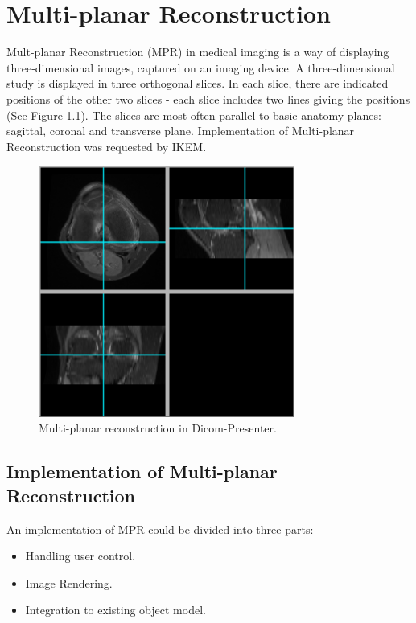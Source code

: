\chapter{Multi-planar Reconstruction}
\vspace{-10mm}
\label{multiplanar}

Mult-planar Reconstruction (MPR) in medical imaging is a way of displaying three-dimensional images, captured on an imaging device. A three-dimensional study is displayed in three orthogonal slices. In each slice, there are indicated positions of the other two slices - each slice includes two lines giving the positions (See Figure \ref{fig:multiplanar}). The slices are most often parallel to basic anatomy planes\cite{ctteachingmanual}: sagittal, coronal and transverse plane.  Implementation of Multi-planar Reconstruction was requested by IKEM.

\begin{figure}
 	\caption{Multi-planar reconstruction in Dicom-Presenter.\label{fig:multiplanar}}
	\begin{center}
	\includegraphics[width=0.75\textwidth]{Text/IMG/MultiPlanar.png}
	\end{center}
\end{figure}

\section{Implementation of Multi-planar Reconstruction}

An implementation of MPR could be divided into three parts:

\begin{itemize}
\item Handling user control. %
\item Image Rendering. %
\item Integration to existing object model. %
\end{itemize}

